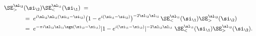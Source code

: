 \begin{equation}\label{nof} \begin{aligned}
\SE_>^{\al_\2}& (\si_\2)\SE^{\al_\1}_<(\si_\1)
\;=\;\\
&=\;e^{i\al_\2\al_\1(\si_\1-\si_\2)}
\big(1-e^{i(\si_\1-\si_\2)}\big)^{-2\al_\2\al_\1}\,\SE^{\al_\1}_{<}(\si_\1)
\SE^{\al_\2}_{>}(\si_\2)\\
& =\;e^{-\pi i \al_\2\al_\1\sgn(\si_\2-\si_\1)}
|1-e^{i(\si_\1-\si_\2)}|^{-2\al_\2\al_\1}\;
\SE^{\al_\1}_{<}(\si_\1)
\SE^{\al_\2}_{>}(\si_\2).
\end{aligned} \end{equation}

